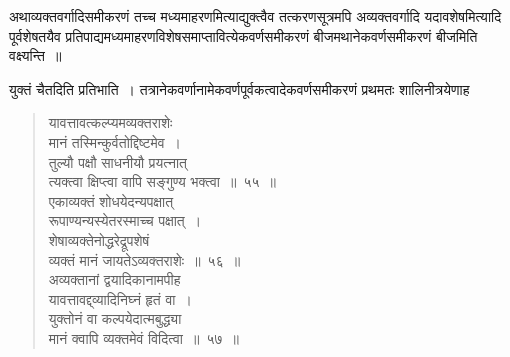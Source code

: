 \documentclass[11pt, openany]{book}
\begin{document}
\vspace{-3mm}
 अथाव्यक्तवर्गादिसमीकरणं तच्च मध्यमाहरणमित्याद्युक्त्वैव तत्करणसूत्रमपि अव्यक्तवर्गादि यदावशेषमित्यादि पूर्वशेषतयैव प्रतिपाद्यमध्यमाहरणविशेषसमाप्तावित्येकवर्णसमीकरणं बीजमथानेकवर्णसमीकरणं बीजमिति वक्ष्यन्ति~॥\\
\newpage

 युक्तं चैतदिति प्रतिभाति~। तत्रानेकवर्णानामेकवर्णपूर्वकत्वादेकवर्णसमीकरणं प्रथमतः शालिनीत्रयेणाह\textendash
 
 \label{55}
\begin{quote}
    \bs
     यावत्तावत्कल्प्यमव्यक्तराशेः \\

\vspace{-7mm}
\hspace{1cm} मानं तस्मिन्कुर्वतोद्दिष्टमेव~। \\

\vspace{-7mm}
 तुल्यौ पक्षौ साधनीयौ प्रयत्नात् \\

\vspace{-7mm}
\hspace{1cm} त्यक्त्वा क्षिप्त्वा वापि सङ्गुण्य भक्त्वा~॥~५५~॥~\\

\vspace{-5mm}
 \label{56}
 एकाव्यक्तं शोधयेदन्यपक्षात् \\

\vspace{-7mm}
\hspace{1cm} रूपाण्यन्यस्येतरस्माच्च पक्षात्~। \\

\vspace{-7mm}
 शेषाव्यक्तेनोद्धरेद्रूपशेषं \\

\vspace{-7mm}
\hspace{1cm} व्यक्तं मानं जायतेऽव्यक्तराशेः~॥~५६~॥~\\

\vspace{-5mm}
 अव्यक्तानां द्वयादिकानामपीह \\

\vspace{-7mm}
\hspace{1cm} यावत्तावद्द्व्यादिनिघ्नं हृतं वा~। \\

\vspace{-7mm}
 युक्तोनं वा कल्पयेदात्मबुद्ध्या \\

\vspace{-7mm}
\hspace{1cm} मानं क्वापि व्यक्तमेवं विदित्वा~॥~५७~॥~
\end{quote}
\end{document}
